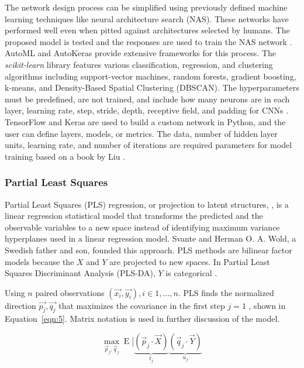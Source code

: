 \documentclass[sn-mathphys-num]{sn-jnl}%
\begin{document}
The network design process can be simplified using previously defined machine learning techniques like neural architecture search (NAS). These networks have performed well even when pitted against architectures selected by humans. The proposed model is tested and the responses are used to train the NAS network \cite{zoph2016neural}. AutoML and AutoKeras \cite{jin2019auto} provide extensive frameworks for this process. The \textit{scikit-learn} library features various classification, regression, and clustering algorithms including support-vector machines, random forests, gradient boosting, k-means, and Density-Based Spatial Clustering (DBSCAN). The hyperparameters must be predefined, are not trained, and include how many neurons are in each layer, learning rate, step, stride, depth, receptive field, and padding for CNNs \cite{claesen2015hyperparameter}. TensorFlow and Keras are used to build a custom network in Python, and the user can define layers, models, or metrics. The data, number of hidden layer units, learning rate, and number of iterations are required parameters for model training based on a book by Liu \cite{liu2020python}.

\subsubsection{Partial Least Squares}

Partial Least Squares (PLS) regression, or projection to latent structures, \cite{wold2001pls, abdi2010partial}, is a linear regression statistical model that transforms the predicted and the observable variables to a new space instead of identifying maximum variance hyperplanes used in a linear regression model. Svante and Herman O. A. Wold, a Swedish father and son, founded this approach. PLS methods are bilinear factor models because the $X$ and $Y$ are projected to new spaces. In Partial Least Squares Discriminant Analysis (PLS-DA), $Y$ is categorical \cite{saebo2008lpls}.

Using $n$ paired observations $\left(\vec{x_{i}}, \vec{y_{i}}\right), i \in 1, \dots, n$. PLS finds the normalized direction $\vec{p_{j}}, \vec{q_{j}}$ that maximizes the covariance in the first step $j = 1$ \cite{youtubeYouTube}, shown in Equation~\ref{eqn:5}. Matrix notation is used in further discussion of the model.

\begin{equation}
	\max_{{\vec{p}}_{j},{\vec{q}}_{j}}\operatorname{E} [\underbrace{({\vec{p}}_{j}\cdot {\vec{X}})}_{t_{j}}\underbrace{({\vec{q}}_{j}\cdot {\vec{Y}})}_{u_{j}}
	\label{eqn:5}
\end{equation}
\end{document}
